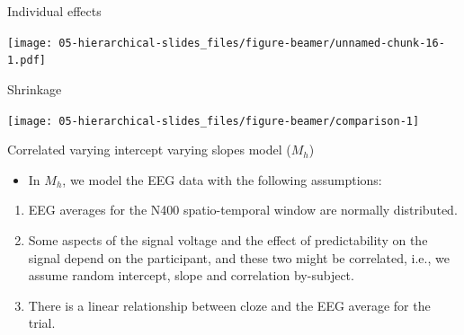 \documentclass[12pt,ignorenonframetext,aspectratio=169]{beamer}
\newenvironment{Shaded}{\begin{snugshade}}{\end{snugshade}}
\newcommand{\CommentTok}[1]{\textcolor[rgb]{0.56,0.35,0.01}{\textit{#1}}}
\newcommand{\DataTypeTok}[1]{\textcolor[rgb]{0.13,0.29,0.53}{#1}}
\newcommand{\FloatTok}[1]{\textcolor[rgb]{0.00,0.00,0.81}{#1}}
\newcommand{\KeywordTok}[1]{\textcolor[rgb]{0.13,0.29,0.53}{\textbf{#1}}}
\newcommand{\NormalTok}[1]{#1}
\newcommand{\OperatorTok}[1]{\textcolor[rgb]{0.81,0.36,0.00}{\textbf{#1}}}
\newcommand{\StringTok}[1]{\textcolor[rgb]{0.31,0.60,0.02}{#1}}
\providecommand{\tightlist}{%
  \setlength{\itemsep}{0pt}\setlength{\parskip}{0pt}}
\begin{document}
\begin{frame}[fragile]{Individual effects}
\protect\hypertarget{individual-effects}{}

\scriptsize

\begin{Shaded}
\end{Shaded}

\normalsize

\end{frame}

\begin{frame}

\vspace{.1in}

\small

\texttt{[image: 05-hierarchical-slides\_files/figure-beamer/unnamed-chunk-16-1.pdf]}

\normalsize

\end{frame}

\begin{frame}{Shrinkage}
\protect\hypertarget{shrinkage}{}

\small

\texttt{[image: 05-hierarchical-slides\_files/figure-beamer/comparison-1]}

\normalsize

\end{frame}

\begin{frame}{Correlated varying intercept varying slopes model (\(M_{h}\))}
\protect\hypertarget{sec:mcvivs}{}

\begin{itemize}
\tightlist
\item
  In \(M_h\), we model the EEG data with the following assumptions:
\end{itemize}

\begin{enumerate}
\tightlist
\item
  EEG averages for the N400 spatio-temporal window are normally distributed.
\item
  Some aspects of the signal voltage and the effect of predictability on the signal depend on the participant, and these two might be correlated, i.e., we assume random intercept, slope and correlation by-subject.
\item
  There is a linear relationship between cloze and the EEG average for the trial.
\end{enumerate}

\end{frame}
\end{document}
